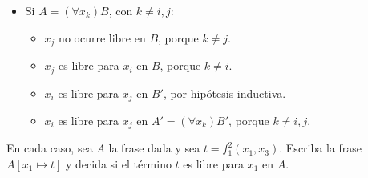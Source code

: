 \begin{solution}
\begin{itemize}
    \item Si $A = (\forall x_k) B$, con $k \ne i,j$:
    \begin{itemize}
        \item $x_j$ no ocurre libre en $B$, porque $k \ne j$.
        \item $x_j$ es libre para $x_i$ en $B$, porque $k \ne i$.
        \item $x_i$ es libre para $x_j$ en $B'$, por hipótesis inductiva.
        \item $x_i$ es libre para $x_j$ en $A' = (\forall x_k) B'$, porque $k \ne i,j$.
    \end{itemize}
\end{itemize}
\end{solution}

\begin{exercise}
En cada caso, sea $A$ la frase dada y sea $t = f_1^2(x_1, x_3)$. Escriba la frase $A[x_1 \mapsto t]$ y decida si el término $t$ es libre para $x_1$ en $A$.
\end{exercise}

